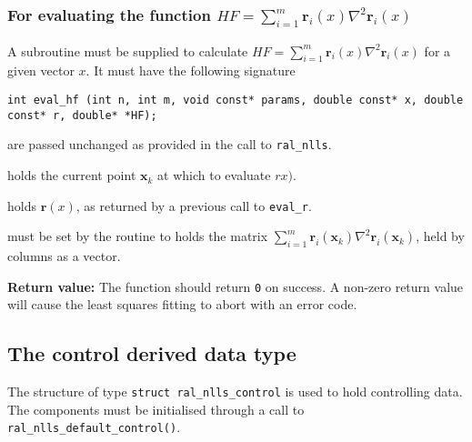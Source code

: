 \documentclass{spec}
\newcommand{\vx}{ {\bm x} } %
\newcommand{\vr}{ {\bm r} } %
\newcommand{\iter}[2][k]{ #2_{#1}^{}} %
\newcommand{\comp}[2][i]{ #2_{#1}^{}} %
\begin{document}
\subsubsection{For evaluating the function $HF = \sum_{i=1}^m \vr_i(x) \nabla^2 \vr_i(x)$}
A subroutine must be supplied to calculate $HF = \sum_{i=1}^m \vr_i(x) \nabla^2 \vr_i(x)$ for a given vector $x$. It must have the following signature

\begin{verbatim}
int eval_hf (int n, int m, void const* params, double const* x, double const* r, double* *HF);
\end{verbatim}

\begin{description}
    are passed unchanged as provided in the call to
      {\tt ral\_nlls}.

    holds the current point $\iter{\vx}$ at which to evaluate $rx)$.
  
    holds $\vr(x)$, as returned by a previous call to \texttt{eval\_r}.

    must be set by the routine to holds the matrix
      $\sum_{i = 1}^m \comp{\vr}(\iter{\vx})\nabla^2\comp{\vr}(\iter{\vx})$, held
      by columns as a vector.
\end{description}
\textbf{Return value:} The function should return \texttt{0} on success. A
non-zero return value will cause the least squares fitting to abort with an
error code.



\subsection{The control derived data type}
\label{typecontrol} 

The structure of type {\tt struct ral\_nlls\_control} is used to hold
controlling data. The components must be initialised through a call to
\texttt{ral\_nlls\_default\_control()}.

\vspace{2mm}
\end{document}
